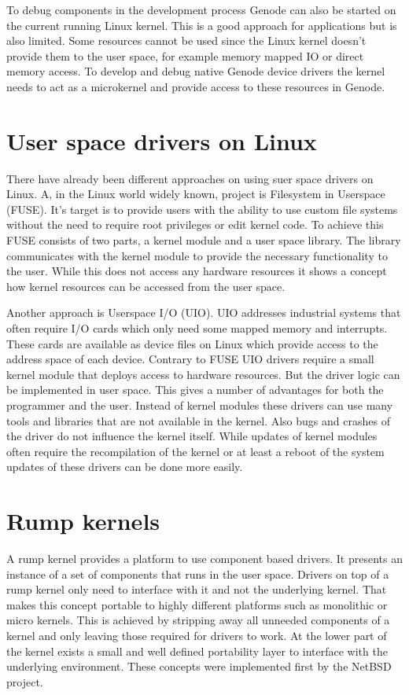 \documentclass[
a4paper,
12pt,
notitlepage,
parskip=half,
DIV=11,
]{scrbook}
\begin{document}
		To debug components in the development process Genode can also be started on the current running Linux kernel.
		This is a good approach for applications but is also limited.
		Some resources cannot be used since the Linux kernel doesn't provide them to the user space, for example memory mapped IO or direct memory access.
		To develop and debug native Genode device drivers the kernel needs to act as a microkernel and provide access to these resources in Genode.
		
		\section{User space drivers on Linux}
		
		There have already been different approaches on using suer space drivers on Linux.
		A, in the Linux world widely known, project is Filesystem in Userspace (FUSE).
		It's target is to provide users with the ability to use custom file systems without the need to require root privileges or edit kernel code.
		To achieve this FUSE consists of two parts, a kernel module and a user space library.
		The library communicates with the kernel module to provide the necessary functionality to the user.
		While this does not access any hardware resources it shows a concept how kernel resources can be accessed from the user space. \citep{fuse}
		
		Another approach is Userspace I/O (UIO).
		UIO addresses industrial systems that often require I/O cards which only need some mapped memory and interrupts.
		These cards are available as device files on Linux which provide access to the address space of each device.
		Contrary to FUSE UIO drivers require a small kernel module that deploys access to hardware resources.
		But the driver logic can be implemented in user space.
		This gives a number of advantages for both the programmer and the user.
		Instead of kernel modules these drivers can use many tools and libraries that are not available in the kernel.
		Also bugs and crashes of the driver do not influence the kernel itself.
		While updates of kernel modules often require the recompilation of the kernel or at least a reboot of the system updates of these drivers can be done more easily. \citep{uio}
		
		\section{Rump kernels}
		A rump kernel provides a platform to use component based drivers.
		It presents an instance of a set of components that runs in the user space.
		Drivers on top of a rump kernel only need to interface with it and not the underlying kernel.
		That makes this concept portable to highly different platforms such as monolithic or micro kernels.
		This is achieved by stripping away all unneeded components of a kernel and only leaving those required for drivers to work.
		At the lower part of the kernel exists a small and well defined portability layer to interface with the underlying environment.
		These concepts were implemented first by the NetBSD project. \citep{bsd_rump}\citep{fosdem_rump}\citep{rump}
		
\end{document}
